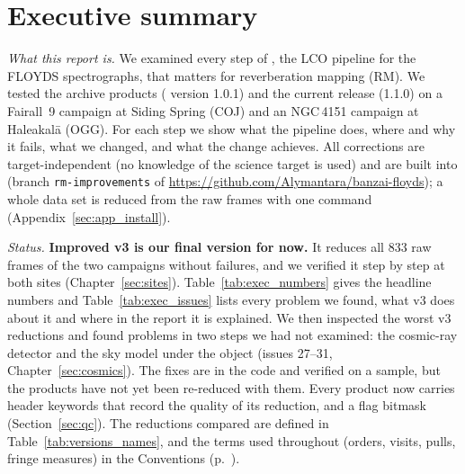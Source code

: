 \chapter*{Executive summary}
\label{sec:exec}

\textit{What this report is.} We examined every step of \banzai{}, the LCO pipeline for the FLOYDS spectrographs,
that matters for reverberation mapping (RM). We tested the archive products (\banzai{} version 1.0.1) and the current
release (1.1.0) on a Fairall~9 campaign at Siding Spring (COJ) and an NGC\,4151 campaign at Haleakal\=a (OGG). For each step we show what the pipeline
does, where and why it fails, what we changed, and what the change achieves. All corrections are target-independent
(no knowledge of the science target is used) and are built into \banzai{} (branch \texttt{rm-improvements} of
\url{https://github.com/Alymantara/banzai-floyds}); a whole data set is reduced from the raw frames with one command
(Appendix~\ref{sec:app_install}).

\textit{Status.} \textbf{Improved v3 is our final version for now.} It reduces all 833 raw frames of the two
campaigns without failures, and we verified it step by step at both sites (Chapter~\ref{sec:sites}). Table~\ref{tab:exec_numbers}
gives the headline numbers and Table~\ref{tab:exec_issues} lists every problem we found, what v3 does about it and where
in the report it is explained. We then inspected the worst
v3 reductions and found problems in two steps we had not examined: the cosmic-ray detector and the sky model under the
object (issues 27--31, Chapter~\ref{sec:cosmics}). The fixes are in the code and verified on a sample, but the
products have not yet been re-reduced with them. Every product now carries header keywords that record the quality of
its reduction, and a flag bitmask (Section~\ref{sec:qc}). The reductions compared are defined in
Table~\ref{tab:versions_names}, and the terms used throughout (orders, visits, pulls, fringe measures) in the
Conventions (p.~\pageref{sec:conventions}).

